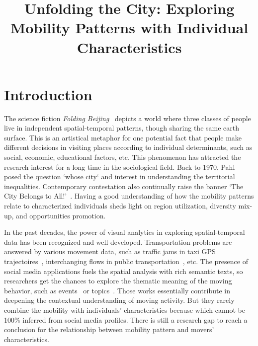 \documentclass{vgtc}                          %
\title{Unfolding the City: Exploring Mobility Patterns with Individual Characteristics}
\begin{document}



\maketitle

\section{Introduction}
The science fiction \textit{Folding Beijing}~\cite{hao2016_foldingbeijing} depicts a world where three classes of people live in independent spatial-temporal patterns, though sharing the same earth surface. This is an artistical metaphor for one potential fact that people make different decisions in visiting places according to individual determinants, such as social, economic, educational factors, etc. This phenomenon has attracted the research interest for a long time in the sociological field. Back to 1970, Pahl~\cite{pahl1975whose} posed the question `whose city` and interest in understanding the territorial inequalities. Contemporary contestation also continually raise the banner `The City Belongs to All!'~\cite{Mayer2017_whosecity}. Having a good understanding of how the mobility patterns relate to characterized individuals sheds light on region utilization, diversity mix-up, and opportunities promotion. 

In the past decades, the power of visual analytics in exploring spatial-temporal data has been recognized and well developed. Transportation problems are answered by various movement data, such as traffic jams in taxi GPS trajectoires~\cite{wang2013visual}, interchanging flows in public transportation~\cite{zeng2013visualizing}, etc. The presence of social media applications fuels the spatial analysis with rich semantic texts, so researchers get the chances to explore the thematic meaning of the moving behavior, such as events~\cite{chen2017map} or topics~\cite{bosch2013scatterblogs2}. Those works essentially contribute in deepening the contextual understanding of moving activity. But they rarely combine the mobility with individuals' characteristics because which cannot be 100\% inferred from social media profiles. There is still a research gap to reach a conclusion for the relationship between mobility pattern and movers' characteristics. 
\end{document}
